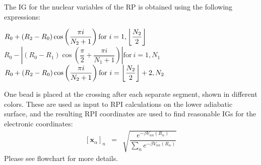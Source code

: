 \documentclass[%
 aip,
 jmp,%
 amsmath,amssymb,
reprint,%
]{revtex4-1}
\DeclarePairedDelimiter\floor{\lfloor}{\rfloor}
\begin{document}
The IG for the nuclear variables of the RP is obtained using the following expressions:
\begin{center}
{\color{gray} $ R_{0}+\left(R_{2}-R_{0}\right) \cos\left( \dfrac{\pi i }{N_{2}+1}\right) \mathrm{for}\ i=1, \floor*{\dfrac{N_{2}}{2}} $ } \vspace*{0.25cm}\\
{\color{green} $   R_{0} - \left| \left( R_{0} - R_{1} \right) \cos\left( \dfrac{\pi}{2} + \dfrac{\pi i }{N_{1}+1}\right) \right| \mathrm{for}\ i=1, N_{1} $ } \vspace*{0.25cm}\\
{\color{gray} $ R_{0}+\left(R_{2}-R_{0}\right) \cos\left( \dfrac{\pi i }{N_{2}+1}\right) \mathrm{for}\ i= \floor*{\dfrac{N_{2}}{2}}+2, N_{2} $ } 
\end{center} 
One bead is placed at the crossing after each separate segment, shown in different colors. These are used as input to RPI calculations on the lower adiabatic surface, and the resulting RPI coordinates are used to find reasonable IGs for the electronic coordinates:
\begin{eqnarray}
\left[\mathbf{x}_{\alpha}\right]_{n} & = & \sqrt{\dfrac{e^{-\beta V_{nn}(R_{\alpha})}}{\sum_{n} e^{-\beta V_{nn}(R_{\alpha})} }}
\end{eqnarray}
Please see flowchart for more details. 
\end{document}
